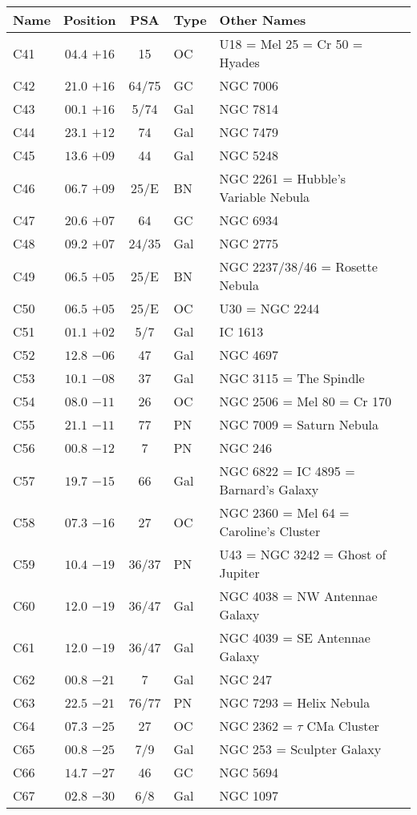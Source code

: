 \begin{table}[p]
\setlength{\tabcolsep}{3pt}
\small
\begin{tabular}{lcclll}
\hline
Name&Position&PSA&Type&Other Names\\
\hline
C41  &$04.4$ $+16$&15&OC &U18 = Mel 25 = Cr 50 = Hyades\\
C42  &$21.0$ $+16$&64/75&GC &NGC 7006\\
C43  &$00.1$ $+16$&5/74&Gal&NGC 7814\\
C44  &$23.1$ $+12$&74&Gal&NGC 7479\\
C45  &$13.6$ $+09$&44&Gal&NGC 5248\\
C46  &$06.7$ $+09$&25/E&BN &NGC 2261 = Hubble's Variable Nebula\\
C47  &$20.6$ $+07$&64&GC &NGC 6934\\
C48  &$09.2$ $+07$&24/35&Gal&NGC 2775\\
C49  &$06.5$ $+05$&25/E&BN &NGC 2237/38/46 = Rosette Nebula\\
C50  &$06.5$ $+05$&25/E&OC &U30 = NGC 2244\\
C51  &$01.1$ $+02$&5/7&Gal&IC 1613\\
C52  &$12.8$ $-06$&47&Gal&NGC 4697\\
C53  &$10.1$ $-08$&37&Gal&NGC 3115 = The Spindle\\
C54  &$08.0$ $-11$&26&OC &NGC 2506 = Mel 80 = Cr 170\\
C55  &$21.1$ $-11$&77&PN &NGC 7009 = Saturn Nebula\\
C56  &$00.8$ $-12$&7&PN &NGC 246\\
C57  &$19.7$ $-15$&66&Gal&NGC 6822 = IC 4895 = Barnard's Galaxy\\
C58  &$07.3$ $-16$&27&OC &NGC 2360 = Mel 64 = Caroline's Cluster\\
C59  &$10.4$ $-19$&36/37&PN &U43 = NGC 3242 = Ghost of Jupiter\\
C60  &$12.0$ $-19$&36/47&Gal&NGC 4038 = NW Antennae Galaxy\\
C61  &$12.0$ $-19$&36/47&Gal&NGC 4039 = SE Antennae Galaxy\\
C62  &$00.8$ $-21$&7&Gal&NGC 247\\
C63  &$22.5$ $-21$&76/77&PN &NGC 7293 = Helix Nebula\\
C64  &$07.3$ $-25$&27&OC &NGC 2362 = $\tau$ CMa Cluster\\
C65  &$00.8$ $-25$&7/9&Gal&NGC 253 = Sculpter Galaxy\\
C66  &$14.7$ $-27$&46&GC &NGC 5694\\
C67  &$02.8$ $-30$&6/8&Gal&NGC 1097\\

\end{tabular}
\end{table}
